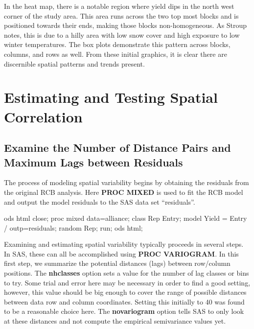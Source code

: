 \documentclass[
]{book}
\newenvironment{Shaded}{\begin{snugshade}}{\end{snugshade}}
\newcommand{\NormalTok}[1]{#1}
\begin{document}
In the heat map, there is a notable region where yield dips in the north west corner of the study area. This area runs across the two top most blocks and is positioned towards their ends, making those blocks non-homogeneous. As Stroup \citep{stroup2013} notes, this is due to a hilly area with low snow cover and high exposure to low winter temperatures. The box plots demonstrate this pattern across blocks, columns, and rows as well. From these initial graphics, it is clear there are discernible spatial patterns and trends present.

\hypertarget{estimating-and-testing-spatial-correlation}{%
\section{Estimating and Testing Spatial Correlation}\label{estimating-and-testing-spatial-correlation}}

\hypertarget{examine-the-number-of-distance-pairs-and-maximum-lags-between-residuals}{%
\subsection{Examine the Number of Distance Pairs and Maximum Lags between Residuals}\label{examine-the-number-of-distance-pairs-and-maximum-lags-between-residuals}}

The process of modeling spatial variability begins by obtaining the residuals from the original RCB analysis. Here \textbf{PROC MIXED} is used to fit the RCB model and output the model residuals to the SAS data set ``residuals''.

\begin{Shaded}
\begin{Highlighting}[]

\NormalTok{ods html close;}
\NormalTok{proc mixed data=alliance;}
\NormalTok{   class Rep Entry;}
\NormalTok{   model Yield = Entry / outp=residuals;}
\NormalTok{   random Rep;}
\NormalTok{run;}
\NormalTok{ods html;}
\end{Highlighting}
\end{Shaded}

Examining and estimating spatial variability typically proceeds in several steps. In SAS, these can all be accomplished using \textbf{PROC VARIOGRAM}. In this first step, we summarize the potential distances (lags) between row/column positions. The \textbf{nhclasses} option sets a value for the number of lag classes or bins to try. Some trial and error here may be necessary in order to find a good setting, however, this value should be big enough to cover the range of possible distances between data row and column coordinates. Setting this initially to 40 was found to be a reasonable choice here. The \textbf{novariogram} option tells SAS to only look at these distances and not compute the empirical semivariance values yet.
\end{document}
